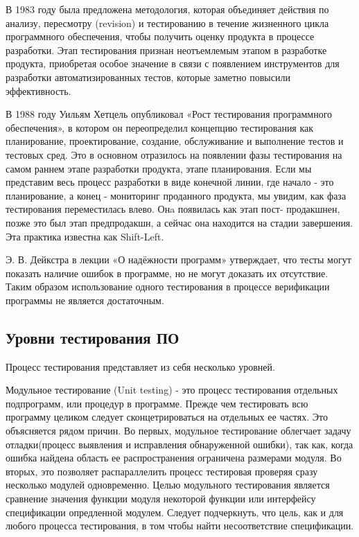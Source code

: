 В 1983 году была предложена методология, которая объединяет действия по анализу, пересмотру 
(revision) и тестированию в течение жизненного цикла программного обеспечения, чтобы получить 
оценку продукта в процессе разработки. Этап тестирования признан неотъемлемым этапом в 
разработке продукта, приобретая особое значение в связи с появлением инструментов для разработки 
автоматизированных тестов, которые заметно повысили эффективность.

В 1988 году Уильям Хетцель опубликовал «Рост тестирования программного обеспечения», в котором 
он переопределил концепцию тестирования как планирование, проектирование, создание, обслуживание 
и выполнение тестов и тестовых сред. Это  в основном отразилось на появлении фазы тестирования 
на самом раннем этапе разработки продукта, этапе планирования. Если мы представим весь процесс 
разработки в виде конечной линии, где начало - это планирование, а конец - мониторинг проданного 
продукта, мы увидим, как фаза тестирования переместилась влево. Онa появилась как этап пост-
продакшнен, позже это был этап предпродакшн, а сейчас она находится на стадии завершения. Эта 
практика известна как Shift-Left.

Э. В. Дейкстра в лекции «О надёжности программ» утверждает, что тесты могут показать наличие 
ошибок в программе, но не могут доказать их отсутствие\autocite{Dijkstra}. Таким образом 
использование одного тестирования в процессе верификации программы не является достаточным. 

\subsection{Уровни тестирования ПО}
Процесс тестирования представляет из себя несколько уровней. 

Модульное тестирование (Unit testing) - это процесс тестирования отдельных подпрограмм, или 
процедур в программе. Прежде чем тестировать всю программу целиком следует сконцетрироваться 
на отдельных ее частях. Это объясняется рядом причин. Во первых, модульное тестирование облегчает задачу
отладки(процесс выявления и исправления обнаруженной ошибки), так как, когда ошибка найдена 
область ее распространения ограничена размерами модуля. Во вторых, это позволяет распараллелить 
процесс тестировая проверяя сразу несколько модулей одновременно. Целью модульного тестирования
является сравнение значения функции модуля некоторой функции или интерфейсу спецификации 
опредленной модулем. Следует подчеркнуть, что цель, как и для любого процесса тестирования, в том
чтобы найти несоответствие спецификации. 

